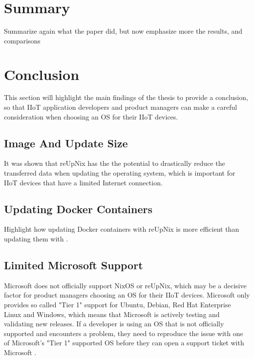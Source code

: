 \section{Summary}
\begin{tcolorbox}[title=TODO]
Summarize again what the paper did, but now emphasize more the results, and comparisons
\end{tcolorbox}

\section{Conclusion}
This section will highlight the main findings of the thesis to provide a
conclusion, so that \ac{IIoT} application developers and product managers can
make a careful consideration when choosing an \ac{OS} for their \ac{IIoT} devices.

\subsection{Image And Update Size}
It was shown that reUpNix has the the potential to drastically reduce the transferred
data when updating the operating system, which is important for \ac{IIoT} devices
that have a limited Internet connection.

\subsection{Updating Docker Containers}

\begin{tcolorbox}[title=TODO]
    Highlight how updating Docker containers with reUpNix is more efficient than
    updating them with .
\end{tcolorbox}

\subsection{Limited Microsoft Support}
Microsoft does not officially support NixOS or reUpNix, which may be a decisive factor
for product managers choosing an \ac{OS} for their \ac{IIoT} devices. Microsoft
only provides so called "Tier 1" support for Ubuntu, Debian, Red Hat Enterprise
Linux and Windows, which means that Microsoft is actively testing and validating
new releases. If a developer is using an \ac{OS} that is not officially supported
and encounters a problem, they need to reproduce the issue with one of Microsoft's
"Tier 1" supported \ac{OS} before they can open a support ticket with Microsoft
\cite{msdoc-supportetplatforms}.

